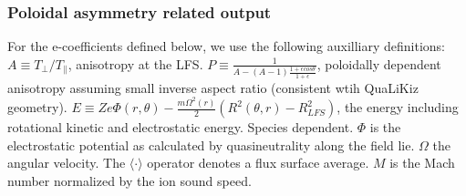 \documentclass{article}
\begin{document}
\subsubsection{Poloidal asymmetry related output}
For the e-coefficients defined below, we use the following auxilliary definitions: $A{\equiv}T_\perp/T_\parallel$, anisotropy at the LFS. $P{\equiv}\frac{1}{A-(A-1)\frac{1+{\epsilon}cos\theta}{1+\epsilon}}$, poloidally dependent anisotropy assuming small inverse aspect ratio (consistent wtih QuaLiKiz geometry). $E{\equiv}Ze\Phi(r,\theta) - \frac{m\Omega^2(r)}{2}(R^2(\theta,r)-R^2_{LFS})$, the energy including rotational kinetic and electrostatic energy. Species dependent. $\Phi$ is the electrostatic potential as calculated by quasineutrality along the field lie. $\Omega$ the angular velocity. The $\langle\cdot\rangle$ operator denotes a flux surface average. $M$ is the Mach number normalized by the ion sound speed.
\end{document}
